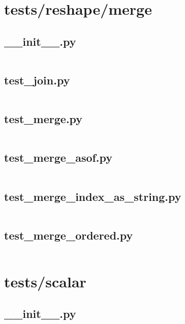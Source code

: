\documentclass{article}
\begin{document}
\section{tests/reshape/merge}

\subsection{\_\_init\_\_.py}
\inputminted{python}{/home/dufferzafar/dev/@clones/pandas/pandas/tests/reshape/merge/__init__.py}
\newpage

\subsection{test\_join.py}
\inputminted{python}{/home/dufferzafar/dev/@clones/pandas/pandas/tests/reshape/merge/test_join.py}
\newpage

\subsection{test\_merge.py}
\inputminted{python}{/home/dufferzafar/dev/@clones/pandas/pandas/tests/reshape/merge/test_merge.py}
\newpage

\subsection{test\_merge\_asof.py}
\inputminted{python}{/home/dufferzafar/dev/@clones/pandas/pandas/tests/reshape/merge/test_merge_asof.py}
\newpage

\subsection{test\_merge\_index\_as\_string.py}
\inputminted{python}{/home/dufferzafar/dev/@clones/pandas/pandas/tests/reshape/merge/test_merge_index_as_string.py}
\newpage

\subsection{test\_merge\_ordered.py}
\inputminted{python}{/home/dufferzafar/dev/@clones/pandas/pandas/tests/reshape/merge/test_merge_ordered.py}
\newpage

\section{tests/scalar}

\subsection{\_\_init\_\_.py}
\inputminted{python}{/home/dufferzafar/dev/@clones/pandas/pandas/tests/scalar/__init__.py}
\newpage
\end{document}
